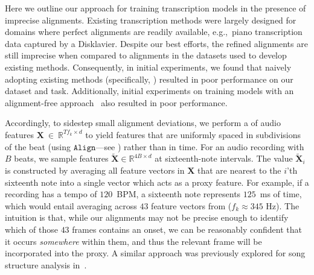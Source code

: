 Here we outline our approach for training transcription models in the presence of imprecise alignments. 
Existing transcription methods were largely designed for domains where perfect alignments are readily available, e.g.,~piano transcription data captured by a Disklavier. 
Despite our best efforts, the refined \hooktheory{} alignments are still imprecise when compared to alignments in the datasets used to develop existing methods. 
Consequently, in initial experiments, we found that naively adopting existing methods (specifically, \cite{hawthorne2017onsets,hawthorne2021sequence}) resulted in poor performance on our dataset and task. 
Additionally, initial experiments on training models with an alignment-free approach~\cite{graves2006connectionist} also resulted in poor performance.

Accordingly, to sidestep small alignment deviations, we perform a \beatpooling{} of audio features $\bm{X}~\in~\mathbb{R}^{Tf_k \times d}$ to yield features that are uniformly spaced in subdivisions of the beat (using $\texttt{Align}$---see ) rather than in time. 
For an audio recording with $B$ beats, we sample features $\tilde{\bm{X}} \in \mathbb{R}^{4B \times d}$ at sixteenth-note intervals. 
The value $\tilde{\bm{X}}_i$ is constructed by averaging all feature vectors in $\bm{X}$ that are nearest to the $i$'th sixteenth note into a single vector which acts as a proxy feature. 
For example, if a recording has a tempo of $120$~BPM, a sixteenth note represents $125$~ms of time, which would entail averaging across 
$43$ feature vectors from \jukebox{} (${f_k \approx 345}$ Hz). 
The intuition is that, while our alignments may not be precise enough to identify which of those $43$ frames contains an onset, we can be reasonably confident that it occurs \emph{somewhere} within them, and thus the relevant frame will be incorporated into the proxy. 
A similar approach was previously explored for song structure analysis in~\cite{mcfee2014analyzing}.%



